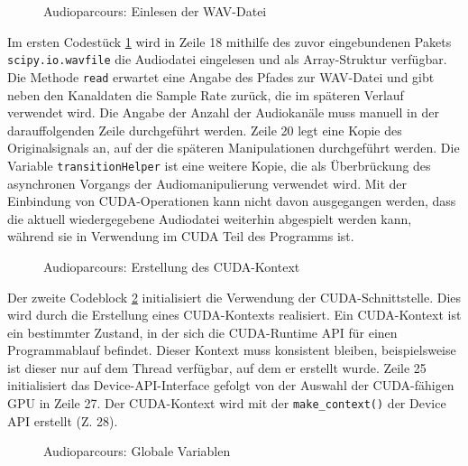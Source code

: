 \begin{figure}[h!]
	
	\caption{Audioparcours: Einlesen der WAV-Datei}
	\label{fig:audioparkour_read_wav_file}
\end{figure}

Im ersten Codestück \ref{fig:audioparkour_read_wav_file} wird in Zeile 18 mithilfe des zuvor eingebundenen Pakets \texttt{scipy.io.wavfile} die Audiodatei eingelesen und als Array-Struktur verfügbar. Die Methode \texttt{read} erwartet eine Angabe des Pfades zur WAV-Datei und gibt neben den Kanaldaten die Sample Rate zurück, die im späteren Verlauf verwendet wird. Die Angabe der Anzahl der Audiokanäle muss manuell in der darauffolgenden Zeile durchgeführt werden. Zeile 20 legt eine Kopie des Originalsignals an, auf der die späteren Manipulationen durchgeführt werden. Die Variable \texttt{transitionHelper} ist eine weitere Kopie, die als Überbrückung des asynchronen Vorgangs der Audiomanipulierung verwendet wird. Mit der Einbindung von CUDA-Operationen kann nicht davon ausgegangen werden, dass die aktuell wiedergegebene Audiodatei weiterhin abgespielt werden kann, während sie in Verwendung im CUDA Teil des Programms ist.

\begin{figure}[h!]
	
	\caption{Audioparcours: Erstellung des CUDA-Kontext}
	\label{fig:audioparkour_cuda_context}
\end{figure}

Der zweite Codeblock \ref{fig:audioparkour_cuda_context} initialisiert die Verwendung der CUDA-Schnittstelle. Dies wird durch die Erstellung eines CUDA-Kontexts realisiert. Ein CUDA-Kontext ist ein bestimmter Zustand, in der sich die CUDA-Runtime API für einen Programmablauf befindet. Dieser Kontext muss konsistent bleiben, beispielsweise ist dieser nur auf dem Thread verfügbar, auf dem er erstellt wurde.
Zeile 25 initialisiert das Device-API-Interface gefolgt von der Auswahl der CUDA-fähigen GPU in Zeile 27. Der CUDA-Kontext wird mit der \texttt{make\_context()} der Device API erstellt (Z. 28).

\begin{figure}[h!]
	
	\caption{Audioparcours: Globale Variablen}
	\label{fig:audioparkour_globals}
\end{figure}

